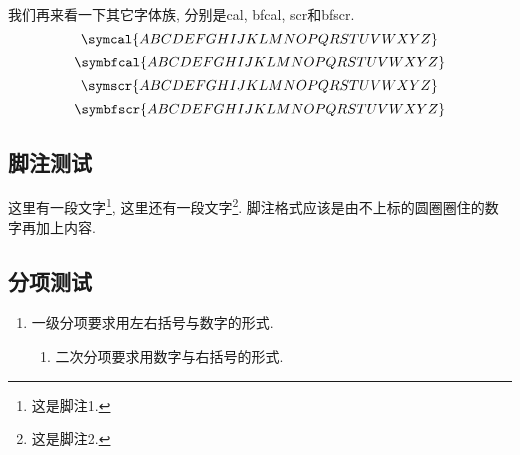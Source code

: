 我们再来看一下其它字体族, 分别是cal, bfcal, scr和bfscr.
\begin{equation}
  \symcal{ABCDEFGHIJKLMNOPQRSTUVWXYZ}
\end{equation}
\begin{equation}
  \symbfcal{ABCDEFGHIJKLMNOPQRSTUVWXYZ}
\end{equation}
\begin{equation}
  \symscr{ABCDEFGHIJKLMNOPQRSTUVWXYZ}
\end{equation}
\begin{equation}
  \symbfscr{ABCDEFGHIJKLMNOPQRSTUVWXYZ}
\end{equation}


\subsection{脚注测试}

这里有一段文字\footnote{这是脚注1.}, 这里还有一段文字\footnote{这是脚注2.}. 脚注格式应该是由不上标的圆圈圈住的数字再加上内容.

\zhlipsum

\subsection{分项测试}

\begin{enumerate}
  \item 一级分项要求用左右括号与数字的形式.
  \begin{enumerate}
    \item 二次分项要求用数字与右括号的形式.
  \end{enumerate}
\end{enumerate}

\zhlipsum[1]

